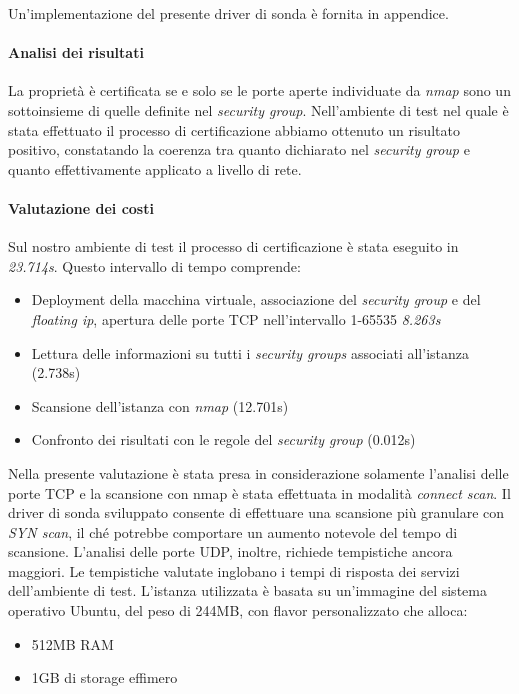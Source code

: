 \documentclass[../main.tex]{subfiles}
\begin{document}
Un'implementazione del presente driver di sonda è fornita in appendice.

\paragraph{Analisi dei risultati}
La proprietà è certificata se e solo se le porte aperte individuate da \textit{nmap} sono un sottoinsieme di quelle definite nel \textit{security group}.
Nell'ambiente di test nel quale è stata effettuato il processo di certificazione abbiamo ottenuto un risultato positivo, constatando la coerenza tra quanto dichiarato nel \textit{security group} e quanto effettivamente applicato a livello di rete.

\paragraph{Valutazione dei costi}

Sul nostro ambiente di test il processo di certificazione è stata eseguito in \textit{23.714s}.
Questo intervallo di tempo comprende:
\begin{itemize}
\item Deployment della macchina virtuale, associazione del \textit{security group} e del \textit{floating ip}, apertura delle porte TCP nell'intervallo 1-65535 \textit{8.263s}
\item Lettura delle informazioni su tutti i \textit{security groups} associati all'istanza (2.738s)
\item Scansione dell'istanza con \textit{nmap} (12.701s)
\item Confronto dei risultati con le regole del \textit{security group} (0.012s)
\end{itemize}
Nella presente valutazione è stata presa in considerazione solamente l'analisi delle porte TCP e la scansione con nmap è stata effettuata in modalità \textit{connect scan}.
Il driver di sonda sviluppato consente di effettuare una scansione più granulare con \textit{SYN scan}, il ché potrebbe comportare un aumento notevole del tempo di scansione.
L'analisi delle porte UDP, inoltre, richiede tempistiche ancora maggiori.
Le tempistiche valutate inglobano i tempi di risposta dei servizi dell'ambiente di test.
L'istanza utilizzata è basata su un'immagine del sistema operativo Ubuntu, del peso di 244MB, con flavor personalizzato che alloca:
\begin{itemize}
\item 512MB RAM
\item 1GB di storage effimero
\end{itemize}
\end{document}
